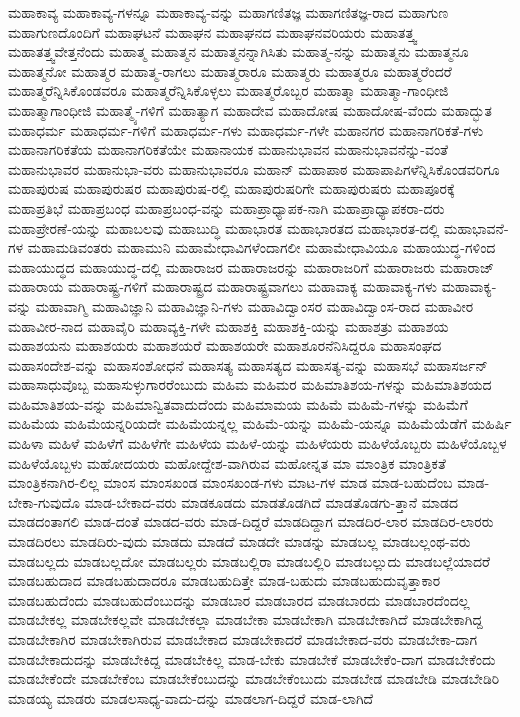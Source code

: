 {ಮಹಾಕಾವ್ಯ
ಮಹಾಕಾವ್ಯ-ಗಳನ್ನೂ
ಮಹಾಕಾವ್ಯ-ವನ್ನು
ಮಹಾಗಣಿತಜ್ಞ
ಮಹಾಗಣಿತಜ್ಞ-ರಾದ
ಮಹಾಗುಣ
ಮಹಾಗುಣದೊಂದಿಗೆ
ಮಹಾಘಟನೆ
ಮಹಾಘನ
ಮಹಾಘನದ
ಮಹಾಘನವರಿಯರು
ಮಹಾತತ್ತ್ವ
ಮಹಾತತ್ತ್ವವೇತ್ತನೆಂದು
ಮಹಾತ್ಮ
ಮಹಾತ್ಮನ
ಮಹಾತ್ಮನನ್ನಾಗಿಸಿತು
ಮಹಾತ್ಮ-ನನ್ನು
ಮಹಾತ್ಮನು
ಮಹಾತ್ಮನೂ
ಮಹಾತ್ಮನೋ
ಮಹಾತ್ಮರ
ಮಹಾತ್ಮ-ರಾಗಲು
ಮಹಾತ್ಮರಾರೂ
ಮಹಾತ್ಮರು
ಮಹಾತ್ಮರೂ
ಮಹಾತ್ಮರೆಂದರೆ
ಮಹಾತ್ಮರೆನ್ನಿಸಿಕೊಂಡವರೂ
ಮಹಾತ್ಮರೆನ್ನಿಸಿಕೊಳ್ಳಲು
ಮಹಾತ್ಮರೊಬ್ಬರ
ಮಹಾತ್ಮಾ
ಮಹಾತ್ಮಾ-ಗಾಂಧೀಜಿ
ಮಹಾತ್ಮಾಗಾಂಧೀಜಿ
ಮಹಾತ್ಮ್ಯೆ-ಗಳಿಗೆ
ಮಹಾತ್ಯಾಗ
ಮಹಾದೇವ
ಮಹಾದೋಷ
ಮಹಾದೋಷ-ವೆಂದು
ಮಹಾದ್ಭುತ
ಮಹಾಧರ್ಮ
ಮಹಾಧರ್ಮ-ಗಳಿಗೆ
ಮಹಾಧರ್ಮ-ಗಳು
ಮಹಾಧರ್ಮ-ಗಳೇ
ಮಹಾನಗರ
ಮಹಾನಾಗರಿಕತೆ-ಗಳು
ಮಹಾನಾಗರಿಕತೆಯ
ಮಹಾನಾಗರಿಕತೆಯೇ
ಮಹಾನಾಯಕ
ಮಹಾನುಭಾವನ
ಮಹಾನುಭಾವನೆನ್ನು-ವಂತೆ
ಮಹಾನುಭಾವರ
ಮಹಾನುಭಾ-ವರು
ಮಹಾನುಭಾವರೂ
ಮಹಾನ್
ಮಹಾಪಾಠ
ಮಹಾಪಾಪಿಗಳೆನ್ನಿಸಿಕೊಂಡವರಿಗೂ
ಮಹಾಪುರುಷ
ಮಹಾಪುರುಷರ
ಮಹಾಪುರುಷ-ರಲ್ಲಿ
ಮಹಾಪುರುಷರಿಗೇ
ಮಹಾಪುರುಷರು
ಮಹಾಪೂರಕ್ಕೆ
ಮಹಾಪ್ರತಿಭೆ
ಮಹಾಪ್ರಬಂಧ
ಮಹಾಪ್ರಬಂಧ-ವನ್ನು
ಮಹಾಪ್ರಾಧ್ಯಾಪಕ-ನಾಗಿ
ಮಹಾಪ್ರಾಧ್ಯಾಪಕರಾ-ದರು
ಮಹಾಪ್ರೇರಣೆ-ಯನ್ನು
ಮಹಾಬಲವು
ಮಹಾಬುದ್ಧಿ
ಮಹಾಭಾರತ
ಮಹಾಭಾರತದ
ಮಹಾಭಾರತ-ದಲ್ಲಿ
ಮಹಾಭಾವನೆ-ಗಳ
ಮಹಾಮಡಿವಂತರು
ಮಹಾಮುನಿ
ಮಹಾಮೇಧಾವಿಗಳೆಂದಾಗಲೀ
ಮಹಾಮೇಧಾವಿಯೂ
ಮಹಾಯುದ್ಧ-ಗಳಿಂದ
ಮಹಾಯುದ್ಧದ
ಮಹಾಯುದ್ಧ-ದಲ್ಲಿ
ಮಹಾರಾಜರ
ಮಹಾರಾಜರನ್ನು
ಮಹಾರಾಜರಿಗೆ
ಮಹಾರಾಜರು
ಮಹಾರಾಜ್
ಮಹಾರಾಯ
ಮಹಾರಾಷ್ಟ್ರ-ಗಳಿಗೆ
ಮಹಾರಾಷ್ಟ್ರದ
ಮಹಾರಾಷ್ಟ್ರವಾಗಲು
ಮಹಾವಾಕ್ಯ
ಮಹಾವಾಕ್ಯ-ಗಳು
ಮಹಾವಾಕ್ಯ-ವನ್ನು
ಮಹಾವಾಗ್ಮಿ
ಮಹಾವಿಜ್ಞಾನಿ
ಮಹಾವಿಜ್ಞಾನಿ-ಗಳು
ಮಹಾವಿದ್ವಾಂಸರ
ಮಹಾವಿದ್ವಾಂಸ-ರಾದ
ಮಹಾವೀರ
ಮಹಾವೀರ-ನಾದ
ಮಹಾವೈರಿ
ಮಹಾವ್ಯಕ್ತಿ-ಗಳೇ
ಮಹಾಶಕ್ತಿ
ಮಹಾಶಕ್ತಿ-ಯನ್ನು
ಮಹಾಶತ್ರು
ಮಹಾಶಯ
ಮಹಾಶಯನು
ಮಹಾಶಯರು
ಮಹಾಶಯರೆ
ಮಹಾಶಯರೇ
ಮಹಾಶೂರನೆನಿಸಿದ್ದರೂ
ಮಹಾಸಂಘದ
ಮಹಾಸಂದೇಶ-ವನ್ನು
ಮಹಾಸಂಶೋಧನೆ
ಮಹಾಸತ್ಯ
ಮಹಾಸತ್ಯದ
ಮಹಾಸತ್ಯ-ವನ್ನು
ಮಹಾಸಭೆ
ಮಹಾಸರ್ಜನ್
ಮಹಾಸಾಧುವೊಬ್ಬ
ಮಹಾಸುಳ್ಳುಗಾರರೆಂಬುದು
ಮಹಿಮ
ಮಹಿಮರ
ಮಹಿಮಾತಿಶಯ-ಗಳನ್ನು
ಮಹಿಮಾತಿಶಯದ
ಮಹಿಮಾತಿಶಯ-ವನ್ನು
ಮಹಿಮಾನ್ವಿತವಾದುದೆಂದು
ಮಹಿಮಾಮಯ
ಮಹಿಮೆ
ಮಹಿಮೆ-ಗಳನ್ನು
ಮಹಿಮೆಗೆ
ಮಹಿಮೆಯ
ಮಹಿಮೆಯನ್ನರಿಯದೇ
ಮಹಿಮೆಯನ್ನಲ್ಲ
ಮಹಿಮೆ-ಯನ್ನು
ಮಹಿಮೆ-ಯನ್ನೂ
ಮಹಿಮೆಯೆಡೆಗೆ
ಮಹಿರ್ಷಿ
ಮಹಿಳಾ
ಮಹಿಳೆ
ಮಹಿಳೆಗೆ
ಮಹಿಳೆಗೇ
ಮಹಿಳೆಯ
ಮಹಿಳೆ-ಯನ್ನು
ಮಹಿಳೆಯರು
ಮಹಿಳೆಯೊಬ್ಬರು
ಮಹಿಳೆಯೊಬ್ಬಳ
ಮಹಿಳೆಯೊಬ್ಬಳು
ಮಹೋದಯರು
ಮಹೋದ್ದೇಶ-ವಾಗಿರುವ
ಮಹೋನ್ನತ
ಮಾ
ಮಾಂತ್ರಿಕ
ಮಾಂತ್ರಿಕತೆ
ಮಾಂತ್ರಿಕನಾಗಿರ-ಲಿಲ್ಲ
ಮಾಂಸ
ಮಾಂಸಖಂಡ
ಮಾಂಸಖಂಡ-ಗಳು
ಮಾಟ-ಗಳ
ಮಾಡ
ಮಾಡ-ಬಹುದೆಂಬ
ಮಾಡ-ಬೇಕಾ-ಗುವುದೊ
ಮಾಡ-ಬೇಕಾದ-ವರು
ಮಾಡಕೂಡದು
ಮಾಡತೊಡಗಿದೆ
ಮಾಡತೊಡಗು-ತ್ತಾನೆ
ಮಾಡದ
ಮಾಡದಂತಾಗಲಿ
ಮಾಡ-ದಂತೆ
ಮಾಡದ-ವರು
ಮಾಡ-ದಿದ್ದರೆ
ಮಾಡದಿದ್ದಾಗ
ಮಾಡದಿರ-ಲಾರ
ಮಾಡದಿರ-ಲಾರರು
ಮಾಡದಿರಲು
ಮಾಡದಿರು-ವುದು
ಮಾಡದು
ಮಾಡದೆ
ಮಾಡದೇ
ಮಾಡನ್ನು
ಮಾಡಬಲ್ಲ
ಮಾಡಬಲ್ಲಂಥ-ವರು
ಮಾಡಬಲ್ಲದು
ಮಾಡಬಲ್ಲದೋ
ಮಾಡಬಲ್ಲರು
ಮಾಡಬಲ್ಲಿರಾ
ಮಾಡಬಲ್ಲಿರಿ
ಮಾಡಬಲ್ಲುದು
ಮಾಡಬಲ್ಲೆಯಾದರೆ
ಮಾಡಬಹುದಾದ
ಮಾಡಬಹುದಾದರೂ
ಮಾಡಬಹುದಿತ್ತೇ
ಮಾಡ-ಬಹುದು
ಮಾಡಬಹುದುವೃತ್ತಾಕಾರ
ಮಾಡಬಹುದೆಂದು
ಮಾಡಬಹುದೆಂಬುದನ್ನು
ಮಾಡಬಾರ
ಮಾಡಬಾರದ
ಮಾಡಬಾರದು
ಮಾಡಬಾರದೆಂದಲ್ಲ
ಮಾಡಬೇಕಲ್ಲ
ಮಾಡಬೇಕಲ್ಲವೇ
ಮಾಡಬೇಕಲ್ಲಾ
ಮಾಡಬೇಕಾ
ಮಾಡಬೇಕಾಗಿ
ಮಾಡಬೇಕಾಗಿದೆ
ಮಾಡಬೇಕಾಗಿದ್ದ
ಮಾಡಬೇಕಾಗಿರ
ಮಾಡಬೇಕಾಗಿರುವ
ಮಾಡಬೇಕಾದ
ಮಾಡಬೇಕಾದರೆ
ಮಾಡಬೇಕಾದ-ವರು
ಮಾಡಬೇಕಾ-ದಾಗ
ಮಾಡಬೇಕಾದುದನ್ನು
ಮಾಡಬೇಕಿದ್ದ
ಮಾಡಬೇಕಿಲ್ಲ
ಮಾಡ-ಬೇಕು
ಮಾಡಬೇಕೆ
ಮಾಡಬೇಕೆಂ-ದಾಗ
ಮಾಡಬೇಕೆಂದು
ಮಾಡಬೇಕೆಂದೇ
ಮಾಡಬೇಕೆಂಬ
ಮಾಡಬೇಕೆಂಬುದನ್ನು
ಮಾಡಬೇಕೆಂಬುದು
ಮಾಡಬೇಡ
ಮಾಡಬೇಡಿ
ಮಾಡಬೇಡಿರಿ
ಮಾಡಯ್ಯ
ಮಾಡರು
ಮಾಡಲಸಾಧ್ಯ-ವಾದು-ದನ್ನು
ಮಾಡಲಾಗ-ದಿದ್ದರೆ
ಮಾಡ-ಲಾಗಿದೆ
}
